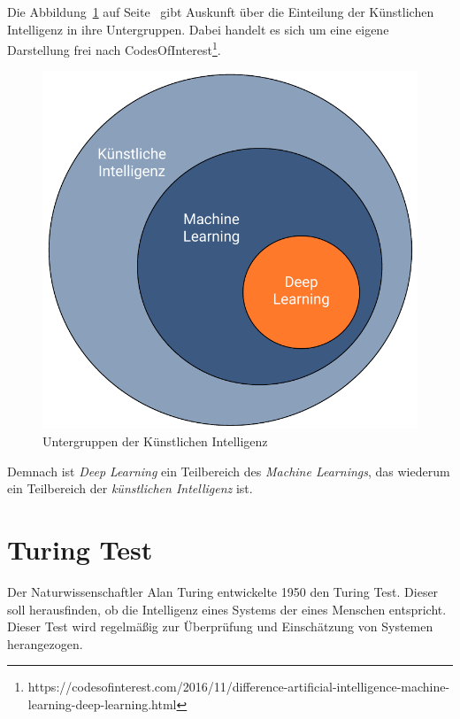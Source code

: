 Die Abbildung~\ref{fig:grundlagen_artificialintelligence} auf Seite~\pageref{fig:grundlagen_artificialintelligence} gibt
Auskunft über die Einteilung der Künstlichen Intelligenz in ihre Untergruppen. Dabei handelt es sich um eine eigene
Darstellung frei nach CodesOfInterest\footnote{https://codesofinterest.com/2016/11/difference-artificial-intelligence-machine-learning-deep-learning.html}.

\begin{figure}[h]
    \centering
    \includegraphics[scale=0.55]{images/kapitel_2/kuenstliche_intelligenz.pdf}
    \caption{Untergruppen der Künstlichen Intelligenz}
    \label{fig:grundlagen_artificialintelligence}
\end{figure}

Demnach ist \textit{Deep Learning} ein Teilbereich des \textit{Machine Learnings}, das wiederum ein Teilbereich der
\textit{künstlichen Intelligenz} ist.

\section{Turing Test}
Der Naturwissenschaftler Alan Turing entwickelte 1950 den Turing Test. Dieser soll herausfinden, ob die Intelligenz eines
Systems der eines Menschen entspricht. Dieser Test wird regelmäßig zur Überprüfung und Einschätzung von Systemen
herangezogen.

